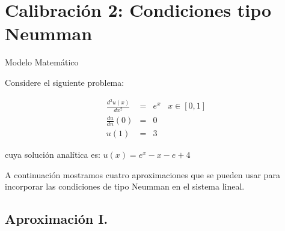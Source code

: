 \documentclass{beamer}
\begin{document}
\section{Calibración 2: Condiciones tipo Neumman}

\begin{frame}{Modelo Matemático}

Considere el siguiente problema:
		
\begin{eqnarray*}
	\frac{d^2 u(x)}{d x^2} & = & e^x \,\,\,\,\, x \in [0,1] \\
	\frac{du}{d n}(0) & = & 0 \\
	u(1) & = & 3
\end{eqnarray*}
		
cuya soluci\'on anal\'itica es:
$\displaystyle u(x) = e^x - x - e + 4 $

\strut

A continuación mostramos cuatro aproximaciones que se pueden usar para 
incorporar las condiciones de tipo Neumman en el sistema lineal.
\end{frame}

\subsection{Aproximación I.}
\end{document}
